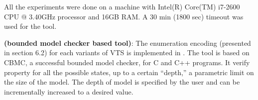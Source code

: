 All the experiments were done
on a machine with Intel(R) Core(TM) i7-2600 CPU @ 3.40GHz processor and 16GB RAM.
%
A 30 min (1800 sec) timeout was used for the tool.

%

%

\textbf{{\sattool} (bounded model checker based tool)}:
The enumeration encoding (presented in section 6.2) for each variants of VTS is implemented in {\sattool}.
The tool is based on CBMC, a successful bounded model checker, for C and C++ programs. 
%
%
It verify property for all the possible states, up to a certain “depth,” a parametric limit on the size of the model.
%
The depth of model is specified by the user and can be  incrementally increased to a desired value.
%
%

